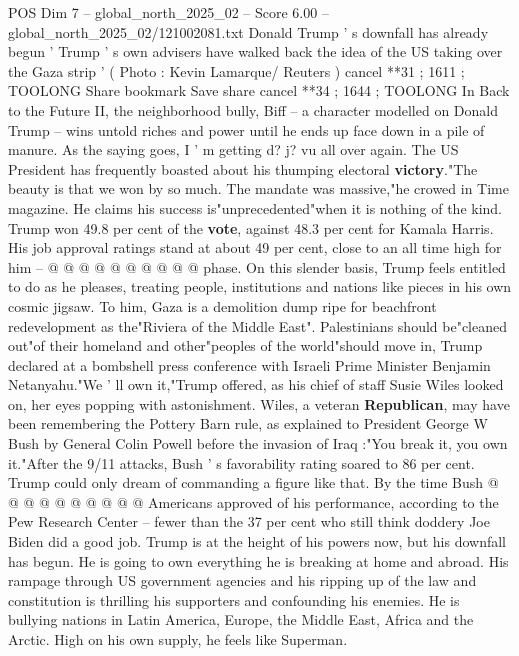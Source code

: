 \begin{textsample}{POS Dim 7 – global\_north\_2025\_02 – Score 6.00 – global\_north\_2025\_02/121002081.txt}  \label{ex:f7_pos_284}
Donald Trump ' s downfall has already begun ' Trump ' s own advisers have walked back the idea of the US taking over the Gaza strip ' ( Photo : Kevin Lamarque/ Reuters ) cancel **31 ; 1611 ; TOOLONG Share bookmark Save share cancel **34 ; 1644 ; TOOLONG In Back to the Future II, the neighborhood bully, Biff -- a character modelled on Donald Trump -- wins untold riches and power until he ends up face down in a pile of manure.
As the saying goes, I ' m getting d? j? vu all over again.
The US President has frequently boasted about his thumping electoral \textbf{victory}."The beauty is that we won by so much.
The mandate was massive,"he crowed in Time magazine.
He claims his success is"unprecedented"when it is nothing of the kind.
Trump won 49.8 per cent of the \textbf{vote}, against 48.3 per cent for Kamala Harris.
His job approval ratings stand at about 49 per cent, close to an all time high for him -- @ @ @ @ @ @ @ @ @ @ phase.
On this slender basis, Trump feels entitled to do as he pleases, treating people, institutions and nations like pieces in his own cosmic jigsaw.
To him, Gaza is a demolition dump ripe for beachfront redevelopment as the"Riviera of the Middle East".
Palestinians should be"cleaned out"of their homeland and other"peoples of the world"should move in, Trump declared at a bombshell press conference with Israeli Prime Minister Benjamin Netanyahu."We ' ll own it,"Trump offered, as his chief of staff Susie Wiles looked on, her eyes popping with astonishment.
Wiles, a veteran \textbf{Republican}, may have been remembering the Pottery Barn rule, as explained to President George W Bush by General Colin Powell before the invasion of Iraq :"You break it, you own it."After the 9/11 attacks, Bush ' s favorability rating soared to 86 per cent.
Trump could only dream of commanding a figure like that.
By the time Bush @ @ @ @ @ @ @ @ @ @ Americans approved of his performance, according to the Pew Research Center -- fewer than the 37 per cent who still think doddery Joe Biden did a good job.
Trump is at the height of his powers now, but his downfall has begun.
He is going to own everything he is breaking at home and abroad.
His rampage through US government agencies and his ripping up of the law and constitution is thrilling his supporters and confounding his enemies.
He is bullying nations in Latin America, Europe, the Middle East, Africa and the Arctic.
High on his own supply, he feels like Superman.

\end{textsample}
